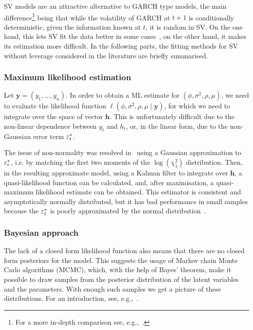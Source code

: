 SV models are an attractive alternative to GARCH type models, the main difference\footnote{For a more in-depth comparison see, e.g.,~\citet{Harvey1994}.} being that while the volatility of GARCH at $t+1$ is conditionally deterministic, given the information known at $t$, it is random in SV.
On the one hand, this lets SV fit the data better in some cases~\citep{Kim1998,Chan2016}, on the other hand, it makes its estimation more difficult. In the following parts, the fitting methods for SV without leverage considered in the literature are briefly summarised.

\subsubsection{Maximum likelihood estimation}

Let $\bm{y}=(y_1,\dots,y_n)$.
In order to obtain a ML estimate for $(\phi,\sigma^2,\rho,\mu)$, we need to evaluate the likelihood function $\ell(\phi,\sigma^2,\rho,\mu\mid\bm{y})$, for which we need to integrate over the space of vector $\bm{h}$.
This is unfortunately difficult due to the non-linear dependence between $y_t$ and $h_t$, or, in the linear form, due to the non-Gaussian error term $\varepsilon_t^\ast$.

The issue of non-normality was resolved in~\citet{Harvey1994} using a Gaussian approximation to $\varepsilon_t^\ast$, i.e. by matching the first two moments of the $\log(\chi_1^2)$ distribution.
Then, in the resulting approximate model, using a Kalman filter to integrate over $\bm{h}$, a quasi-likelihood function can be calculated, and, after maximisation, a quasi-maximum likelihood estimate can be obtained.
This estimator is consistent and asymptotically normally distributed, but it has bad performance in small samples because the $\varepsilon_t^\ast$ is poorly approximated by the normal distribution~\citep{Kim1998}.

\subsubsection{Bayesian approach}

The lack of a closed form likelihood function also means that there are no closed form posteriors for the model.
This suggests the usage of Markov chain Monte Carlo algorithms (MCMC), which, with the help of Bayes' theorem, make it possible to draw samples from the posterior distribution of the latent variables and the parameters.
With enough such samples we get a picture of these distributions.
For an introduction, see, e.g.,~\citet{Geyer2011}.

